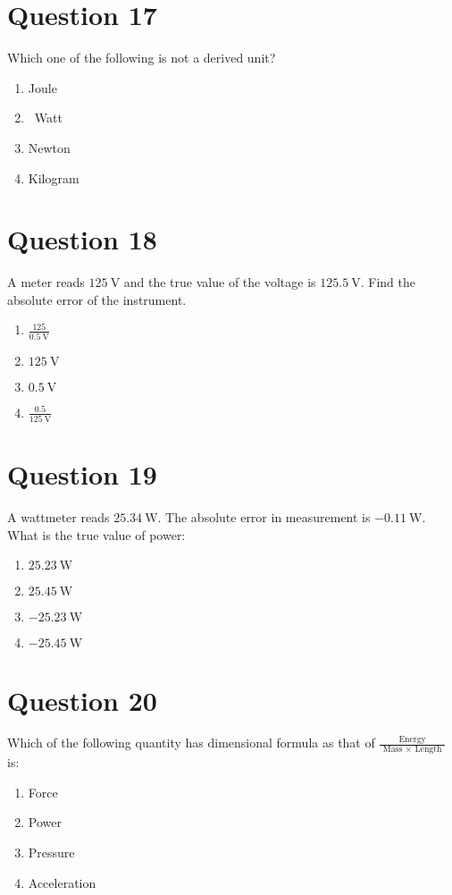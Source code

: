 \documentclass{article}
\begin{document}
\section*{Question 17}
Which one of the following is not a derived unit?
\begin{enumerate}[label=(\alph*)]
\item Joule
\item  Watt
\item Newton
\item Kilogram
\end{enumerate}
\newpage
\section*{Question 18}
A meter reads \(125 \mathrm{~V}\) and the true value of the voltage is \(125.5 \mathrm{~V}\). Find the absolute error of the instrument.
\begin{enumerate}[label=(\alph*)]
\item \(\frac{125 }{0.5 \mathrm{~V}}\)
\item \(125 \mathrm{~V}\)
\item \(0.5 \mathrm{~V}\)
\item \(\frac{0.5 }{125 \mathrm{~V}}\)
\end{enumerate}
\newpage
\section*{Question 19}
A wattmeter reads \(25.34 \mathrm{~W}\). The absolute error in measurement is \(-0.11 \mathrm{~W}\). What is the true value of power:
\begin{enumerate}[label=(\alph*)]
\item \(25.23 \mathrm{~W}\)
\item \(25.45 \mathrm{~W}\)
\item \(-25.23 \mathrm{~W}\)
\item \(-25.45 \mathrm{~W}\)
\end{enumerate}
\newpage
\section*{Question 20}
Which of the following quantity has dimensional formula as that of \(\frac{\text { Energy }}{\text { Mass } \times \text { Length }}\) is:
\begin{enumerate}[label=(\alph*)]
\item Force
\item Power
\item Pressure
\item Acceleration
\end{enumerate}
\newpage
\end{document}
